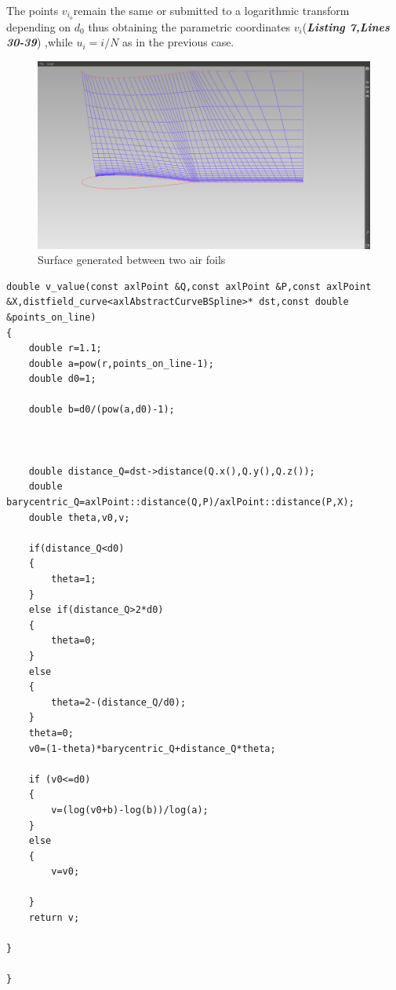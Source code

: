 \documentclass[12pt,a4paper]{article}
\begin{document}
 
 The points $ v_{i_{o}} $remain the same or submitted to a logarithmic transform depending on $d_{0}$ thus obtaining the parametric coordinates $v_{i}$(\textbf{\textit{Listing 7,Lines 30-39}}) ,while $u_{i}=i/N$ as in the previous case.
 
 
  
 \begin{figure}
 \begin{center}
\includegraphics[scale=0.2]{PICTURES2/Other_body_surface.png} 
\end{center}
\caption{Surface generated between two air foils}
 \end{figure}

 
\begin{lstlisting}[label=some-code,breaklines=true,caption=Subdivision Criteria]
double v_value(const axlPoint &Q,const axlPoint &P,const axlPoint &X,distfield_curve<axlAbstractCurveBSpline>* dst,const double  &points_on_line)
{
    double r=1.1;
    double a=pow(r,points_on_line-1);
    double d0=1;

    double b=d0/(pow(a,d0)-1);



    double distance_Q=dst->distance(Q.x(),Q.y(),Q.z());
    double barycentric_Q=axlPoint::distance(Q,P)/axlPoint::distance(P,X);
    double theta,v0,v;

    if(distance_Q<d0)
    {
        theta=1;
    }
    else if(distance_Q>2*d0)
    {
        theta=0;
    }
    else
    {
        theta=2-(distance_Q/d0);
    }
    theta=0;
    v0=(1-theta)*barycentric_Q+distance_Q*theta;

    if (v0<=d0)
    {
        v=(log(v0+b)-log(b))/log(a);
    }
    else
    {
        v=v0;

    }
    return v;

}

}
\end{lstlisting}
\end{document}
